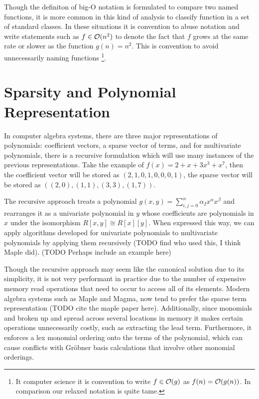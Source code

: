 Though the definiton of big-O notation is formulated to compare two named functions, it is more common in this kind of analysis to classify function in a set of standard classes. In these situations it is convention to abuse notation and write statements such as $f \in \mathcal O(n^2)$ to denote the fact that $f$ grows at the same rate or slower as the function $g(n) = n^2$. This is convention to avoid unnecessarily naming functions \footnote{It computer science it is convention to write $f \in \mathcal O(g)$ as $f(n) = \mathcal O(g(n))$. In comparison our relaxed notation is quite tame.}.

\section{Sparsity and Polynomial Representation}

In computer algebra systems, there are three major representations of polynomials: coefficient vectors, a sparse vector of terms, and for multivariate polynomials, there is a recursive formulation which will use many instances of the previous representations. Take the example of $f(x) = 2 + x + 3x^3 + x^7$, then the coefficient vector will be stored as $(2, 1, 0, 1, 0, 0, 0, 1)$, the sparse vector will be stored as $((2, 0), (1, 1), (3, 3), (1, 7))$. 

The recursive approach treats a polynomial $g(x, y) = \sum_{i, j = 0}^n \alpha_I x^\alpha x^\beta$ and rearranges it as a univariate polynomial in $y$ whose coefficients are polynomials in $x$ under the isomorphism $R[x, y] \cong R[x][y]$. When expressed this way, we can apply algorithms developed for univariate polynomials to multivariate polynomials by applying them recursively (TODO find who used this, I think Maple did).
(TODO Perhaps include an example here)

Though the recursive approach may seem like the canonical solution due to its simplicity, it is not very performant in practice due to the number of expensive memory read operations that need to occur to access all of its elements. Modern algebra systems such as Maple and Magma, now tend to prefer the sparse term representation (TODO cite the maple paper here). Additionally, since monomials and broken up and spread across several locations in memory it makes certain operations unnecessarily costly, such as extracting the lead term. Furthermore, it enforces a lex monomial ordering onto the terms of the polynomial, which can cause conflicts with Gr\"{o}bner basis calculations that involve other monomial orderings.

